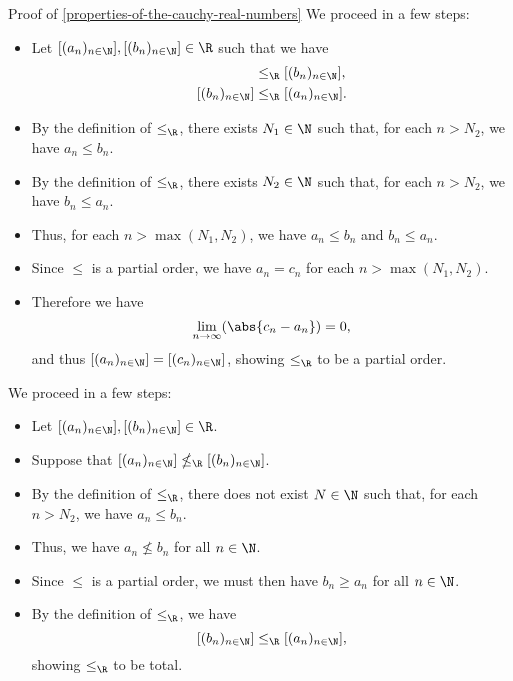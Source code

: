 \begin{Proof}{Proof of \cref{properties-of-the-cauchy-real-numbers}}
    We proceed in a few steps:
    \begin{itemize}
        \item Let $[(a_{n})_{n\in\N}],[(b_{n})_{n\in\N}]\in\R$ such that we have
            \begin{align*}
                [(a_{n})_{n\in\N}] &\leq_{\R} [(b_{n})_{n\in\N}],\\
                [(b_{n})_{n\in\N}] &\leq_{\R} [(a_{n})_{n\in\N}].
            \end{align*}
        \item By the definition of $\leq_{\R}$, there exists $N_{1}\in\N$ such that, for each $n\greater N_{2}$, we have $a_{n}\leq b_{n}$.
        \item By the definition of $\leq_{\R}$, there exists $N_{2}\in\N$ such that, for each $n\greater N_{2}$, we have $b_{n}\leq a_{n}$.
        \item Thus, for each $n\greater\max(N_{1},N_{2})$, we have $a_{n}\leq b_{n}$ and $b_{n}\leq a_{n}$.
        \item Since $\leq$ is a partial order, we have $a_{n}=c_{n}$ for each $n\greater\max(N_{1},N_{2})$.
        \item Therefore we have
            \[
                \lim_{n\to\infty}(\abs{c_{n}-a_{n}})%
                =%
                0,%
            \]%
            and thus $[(a_{n})_{n\in\N}]=[(c_{n})_{n\in\N}]$, showing $\leq_{\R}$ to be a partial order.
    \end{itemize}

    We proceed in a few steps:
    \begin{itemize}
        \item Let $[(a_{n})_{n\in\N}],[(b_{n})_{n\in\N}]\in\R$.
        \item Suppose that $[(a_{n})_{n\in\N}]\nleq_{\R}[(b_{n})_{n\in\N}]$.
        \item By the definition of $\leq_{\R}$, there does not exist $N\in\N$ such that, for each $n\greater N_{2}$, we have $a_{n}\leq b_{n}$.
        \item Thus, we have $a_{n}\nleq b_{n}$ for all $n\in\N$.
        \item Since $\leq$ is a partial order, we must then have $b_{n}\geq a_{n}$ for all $n\in\N$.
        \item By the definition of $\leq_{\R}$, we have
            \[
                [(b_{n})_{n\in\N}]%
                \leq_{\R}%
                [(a_{n})_{n\in\N}],%
            \]%
            showing $\leq_{\R}$ to be total.
    \end{itemize}


\end{Proof}
